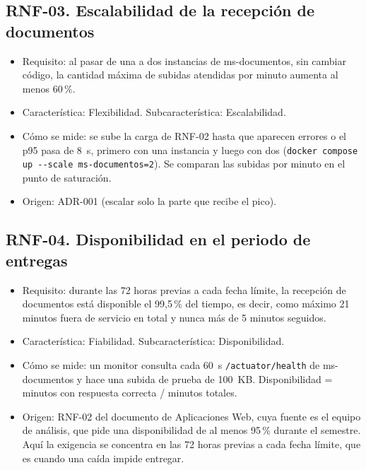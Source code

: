 \subsection*{RNF-03. Escalabilidad de la recepción de documentos}
\begin{itemize}
  \item Requisito: al pasar de una a dos instancias de ms-documentos, sin cambiar código, la cantidad máxima de subidas atendidas por minuto aumenta al menos 60\,\%.
  \item Característica: Flexibilidad. Subcaracterística: Escalabilidad.
  \item Cómo se mide: se sube la carga de RNF-02 hasta que aparecen errores o el p95 pasa de 8~s, primero con una instancia y luego con dos (\texttt{docker compose up -{}-scale ms-documentos=2}). Se comparan las subidas por minuto en el punto de saturación.
  \item Origen: ADR-001 (escalar solo la parte que recibe el pico).
\end{itemize}

\subsection*{RNF-04. Disponibilidad en el periodo de entregas}
\begin{itemize}
  \item Requisito: durante las 72 horas previas a cada fecha límite, la recepción de documentos está disponible el 99,5\,\% del tiempo, es decir, como máximo 21 minutos fuera de servicio en total y nunca más de 5 minutos seguidos.
  \item Característica: Fiabilidad. Subcaracterística: Disponibilidad.
  \item Cómo se mide: un monitor consulta cada 60~s \texttt{/actuator/health} de ms-documentos y hace una subida de prueba de 100~KB. Disponibilidad = minutos con respuesta correcta / minutos totales.
  \item Origen: RNF-02 del documento de Aplicaciones Web, cuya fuente es el equipo de análisis, que pide una disponibilidad de al menos 95\,\% durante el semestre. Aquí la exigencia se concentra en las 72 horas previas a cada fecha límite, que es cuando una caída impide entregar.
\end{itemize}

